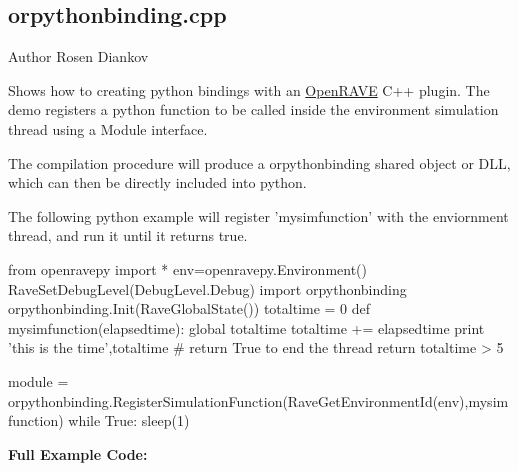 \hypertarget{orpythonbinding.cpp-example}{
\subsection{orpythonbinding.cpp}
}
\begin{DoxyAuthor}{Author}
Rosen Diankov
\end{DoxyAuthor}
Shows how to creating python bindings with an \hyperlink{namespaceOpenRAVE}{OpenRAVE} C++ plugin. The demo registers a python function to be called inside the environment simulation thread using a Module interface.

The compilation procedure will produce a orpythonbinding shared object or DLL, which can then be directly included into python.

The following python example will register 'mysimfunction' with the enviornment thread, and run it until it returns true. \begin{DoxyVerb}
   from openravepy import *
   env=openravepy.Environment()
   RaveSetDebugLevel(DebugLevel.Debug)
   import orpythonbinding
   orpythonbinding.Init(RaveGlobalState())
   totaltime = 0
   def mysimfunction(elapsedtime):
    global totaltime
    totaltime += elapsedtime
    print 'this is the time',totaltime
 # return True to end the thread
    return totaltime > 5

   module = orpythonbinding.RegisterSimulationFunction(RaveGetEnvironmentId(env),mysimfunction)
   while True:
    sleep(1)
    \end{DoxyVerb}


{\bfseries Full Example Code:}


